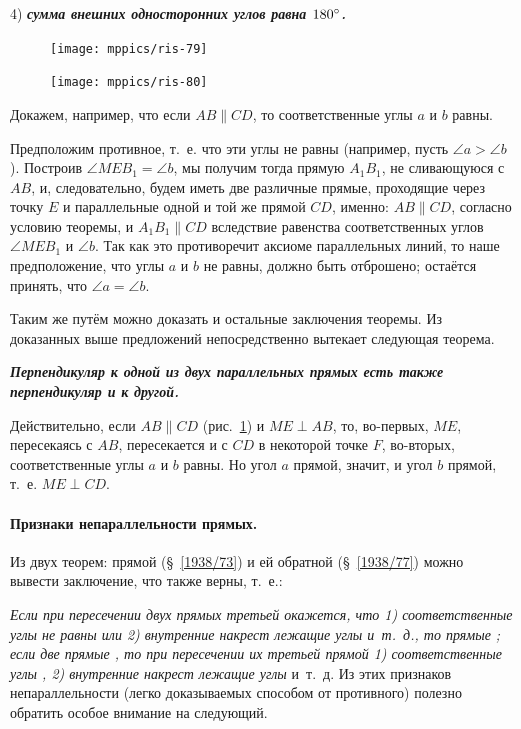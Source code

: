 \documentclass[oneside]{book}
\begin{document}
4) \textbf{\emph{сумма внешних односторонних углов равна $180\degree$.}}

\begin{figure}
\centering
\texttt{[image: mppics/ris-79]}
\caption{}\label{1938/ris-79}
\bigskip
\texttt{[image: mppics/ris-80]}
\caption{}\label{1938/ris-80}
\end{figure}

Докажем, например, что если $AB\parallel CD$, то соответственные углы $a$ и $b$ равны.

Предположим противное, т.~е. что эти углы не равны (например, пусть $\angle a > \angle b$).
Построив $\angle MEB_1 = \angle b$, мы получим тогда прямую $A_1B_1$, не сливающуюся с $AB$, и, следовательно, будем иметь две различные прямые, проходящие через точку $E$ и параллельные одной и той же прямой $CD$, именно:
$AB\parallel CD$, согласно условию теоремы, и $A_1B_1\parallel CD$ вследствие равенства соответственных углов $\angle MEB_1$ и $\angle b$.
Так как это противоречит аксиоме параллельных линий, то наше предположение, что углы $a$ и $b$ не равны, должно быть отброшено;
остаётся принять, что $\angle a = \angle b$.

Таким же путём можно доказать и остальные заключения теоремы.
Из доказанных выше предложений непосредственно вытекает следующая теорема.

\textbf{\emph{Перпендикуляр к одной из двух параллельных прямых есть также перпендикуляр и к другой.}}

Действительно, если $AB\parallel CD$ (рис.~\ref{1938/ris-80}) и $ME\perp AB$, то, во-первых, $ME$, пересекаясь с $AB$, пересекается и с $CD$ в некоторой точке $F$, во-вторых, соответственные углы $a$ и $b$ равны.
Но угол $a$ прямой, значит, и угол $b$ прямой, т.~е.
$ME\perp CD$.

\paragraph{Признаки непараллельности прямых.}\label{1938/78} %
Из двух теорем:
прямой (§~\ref{1938/73}) и ей обратной (§~\ref{1938/77}) можно вывести заключение, что  также верны, т.~е.:

\emph{Если при пересечении двух прямых третьей окажется, что 1) соответственные углы не равны или 2) внутренние накрест лежащие углы  и~т.~д., то прямые ;
если две прямые , то при пересечении их третьей прямой 1) соответственные углы , 2) внутренние накрест лежащие углы } и~т.~д.
Из этих признаков непараллельности (легко доказываемых способом от противного) полезно обратить особое внимание на следующий.
\end{document}
